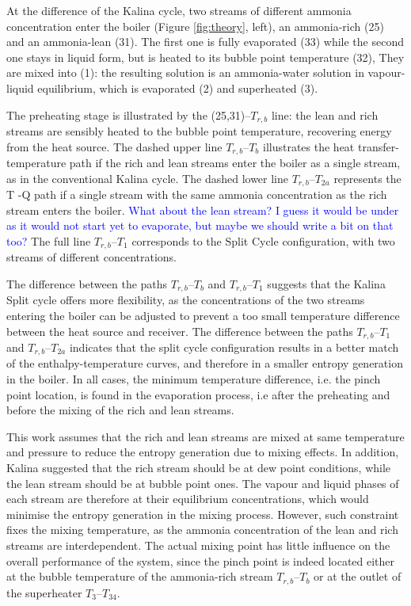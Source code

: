 \documentclass[final,times,3p]{elsarticle}
\begin{document}
At the difference of the Kalina cycle, two streams of different ammonia concentration enter the boiler (Figure \ref{fig:theory}, left), an ammonia-rich (25) and an ammonia-lean (31). The first one is fully evaporated (33) while the second one stays in liquid form, but is heated to its bubble point temperature (32), They are mixed into (1): the resulting solution is an ammonia-water solution in vapour-liquid equilibrium, which is evaporated (2) and superheated (3). 

The preheating stage is illustrated by the (25,31)--$T_{r,b}$ line: the lean and rich streams are sensibly heated to the bubble point temperature, recovering energy from the heat source. The dashed upper line $T_{r,b}$--$T_b$ illustrates the heat transfer-temperature path if the rich and lean streams enter the boiler as a single stream, as in the conventional Kalina cycle. The dashed lower line $T_{r,b}$--$T_{2a}$ represents the T -Q path if a single stream with the same ammonia concentration as the rich stream enters the boiler. \textcolor{blue}{What about the lean stream? I guess it would be under as it would not start yet to evaporate, but maybe we should write a bit on that too?} The full line $T_{r,b}$--$T_{1}$ corresponds to the Split Cycle configuration, with two streams of different concentrations. 

The difference between the paths $T_{r,b}$--$T_b$ and $T_{r,b}$--$T_{1}$ suggests that the Kalina Split cycle offers more flexibility, as the concentrations of the two streams entering the boiler can be adjusted to prevent a too small temperature difference between the heat source and receiver. The difference between the paths $T_{r,b}$--$T_{1}$ and $T_{r,b}$--$T_{2a}$ indicates that the split cycle configuration results in a better match of the enthalpy-temperature curves, and therefore in a smaller entropy generation in the boiler. In all cases, the minimum temperature difference, i.e. the pinch point location, is found in the evaporation process, i.e after the preheating and before the mixing of the rich and lean streams. 

 

This work assumes that the rich and lean streams are mixed at same temperature and pressure to reduce the entropy generation due to mixing effects. In addition, Kalina \cite{Kalina1986a} suggested that the rich stream should be at dew point conditions, while the lean stream should be at bubble point ones. The vapour and liquid phases of each stream are therefore at their equilibrium concentrations, which would minimise the entropy generation in the mixing process. However, such constraint fixes the mixing temperature, as the ammonia concentration of the lean and rich streams are interdependent. The actual mixing point has little influence on the overall performance of the system, since the pinch point is indeed located either at the bubble temperature of the ammonia-rich stream $T_{r,b}$--$T_{b}$ or at the outlet of the superheater $T_{3}$--$T_{34}$. 
\end{document}
